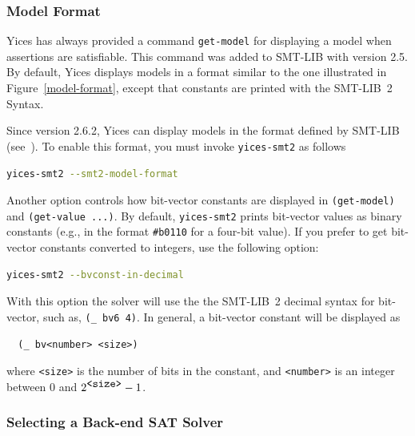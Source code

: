 \documentclass[11pt,twoside,fleqn,openright,titlepage]{cslreport}
\begin{document}
\subsubsection*{Model Format}

Yices has always provided a command \texttt{get-model} for displaying
a model when assertions are satisfiable. This command was added to
SMT-LIB with version 2.5. By default, Yices displays models in a
format similar to the one illustrated in Figure~\ref{model-format},
except that constants are printed with the SMT-LIB~2 Syntax.

\medskip\noindent Since version 2.6.2, Yices can display models
in the format defined by SMT-LIB (see~\cite{SMTLIB26:2017}).  To
enable this format, you must invoke \texttt{yices-smt2} as follows
\begin{small}
\begin{lstlisting}[language=sh]
   yices-smt2 --smt2-model-format
\end{lstlisting}
\end{small}

\medskip\noindent Another option controls how bit-vector constants are
displayed in \texttt{(get-model)} and \texttt{(get-value ...)}. By
default, \texttt{yices-smt2} prints bit-vector values as binary
constants (e.g., in the format \texttt{\#b0110} for a four-bit value).
If you prefer to get bit-vector constants converted to integers, use
the following option:
\begin{small}
\begin{lstlisting}[language=sh,deletekeywords={in}]
   yices-smt2 --bvconst-in-decimal
\end{lstlisting}
\end{small}
With this option the solver will use the the SMT-LIB~2 decimal syntax
for bit-vector, such as, \texttt{(\_\ bv6 4)}. In general, a
bit-vector constant will be displayed as
\begin{small}
\begin{verbatim}
  (_ bv<number> <size>)
\end{verbatim}
\end{small}
where \texttt{<size>} is the number of bits in the constant, and
\texttt{<number>} is an integer between $0$ and $2^{\mbox{\texttt{<size>}}}-1$.


\subsubsection*{Selecting a Back-end SAT Solver}
\end{document}
